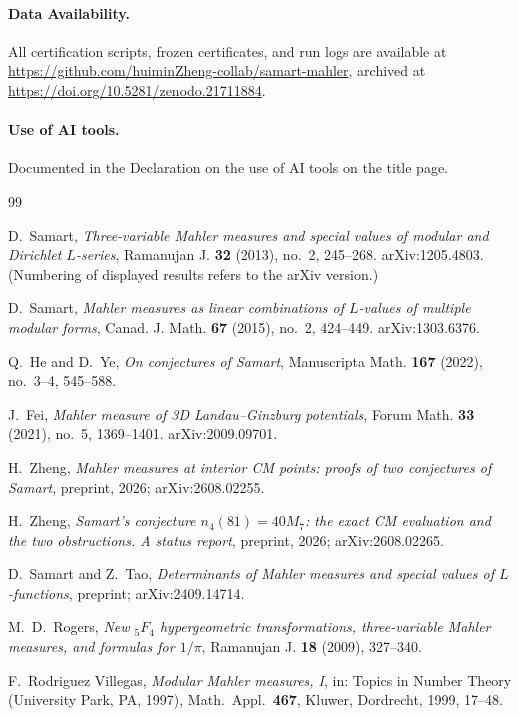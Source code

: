 \documentclass[11pt]{article}
\theoremstyle{definition}
\theoremstyle{remark}
\begin{document}
\paragraph{Data Availability.} All certification scripts, frozen
certificates, and run logs are available at
\url{https://github.com/huiminZheng-collab/samart-mahler}, archived at
\url{https://doi.org/10.5281/zenodo.21711884}.
\paragraph{Use of AI tools.} Documented in the Declaration on the use of
AI tools on the title page.

\begin{thebibliography}{99}

D.~Samart,
\emph{Three-variable Mahler measures and special values of modular and
Dirichlet $L$-series},
Ramanujan J. \textbf{32} (2013), no.~2, 245--268.
arXiv:1205.4803. (Numbering of displayed results refers to the arXiv
version.)

D.~Samart,
\emph{Mahler measures as linear combinations of $L$-values of multiple
modular forms},
Canad. J. Math. \textbf{67} (2015), no.~2, 424--449.
arXiv:1303.6376.

Q.~He and D.~Ye,
\emph{On conjectures of Samart},
Manuscripta Math. \textbf{167} (2022), no.~3--4, 545--588.

J.~Fei,
\emph{Mahler measure of 3D Landau--Ginzburg potentials},
Forum Math. \textbf{33} (2021), no.~5, 1369--1401.
arXiv:2009.09701.

H.~Zheng,
\emph{Mahler measures at interior CM points: proofs of two conjectures
of Samart},
preprint, 2026; arXiv:2608.02255.

H.~Zheng,
\emph{Samart's conjecture $n_4(81)=40M_7$: the exact CM evaluation and
the two obstructions. A status report},
preprint, 2026; arXiv:2608.02265.

D.~Samart and Z.~Tao,
\emph{Determinants of Mahler measures and special values of
$L$-functions},
preprint; arXiv:2409.14714.

M.~D.~Rogers,
\emph{New ${}_5F_4$ hypergeometric transformations, three-variable
Mahler measures, and formulas for $1/\pi$},
Ramanujan J. \textbf{18} (2009), 327--340.

F.~Rodriguez Villegas,
\emph{Modular Mahler measures, I},
in: Topics in Number Theory (University Park, PA, 1997),
Math.\ Appl.\ \textbf{467}, Kluwer, Dordrecht, 1999, 17--48.


\end{thebibliography}
\end{document}
